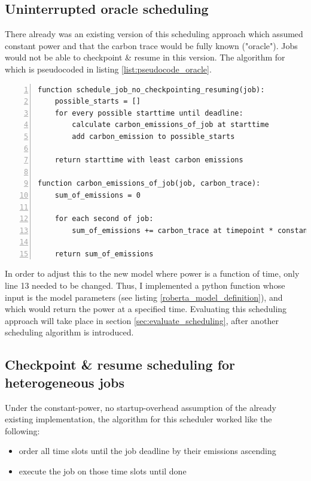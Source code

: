 \subsection{Uninterrupted oracle scheduling} \label{sec:uninterrupted_oracle_scheduling}

There already was an existing version of this scheduling approach which assumed constant power and that the carbon trace would be fully known ("oracle"). 
Jobs would not be able to checkpoint \& resume in this version.
The algorithm for which is pseudocoded in listing \ref{list:pseudocode_oracle}.

\begin{lstlisting}[frame=single, numbers=left, caption={Pseudocode for the original non-interrupt oracle scheduler}, label={list:pseudocode_oracle}, basicstyle=\ttfamily]
function schedule_job_no_checkpointing_resuming(job):
    possible_starts = []
    for every possible starttime until deadline:
        calculate carbon_emissions_of_job at starttime
        add carbon_emission to possible_starts
    
    return starttime with least carbon emissions

function carbon_emissions_of_job(job, carbon_trace):
    sum_of_emissions = 0

    for each second of job:
        sum_of_emissions += carbon_trace at timepoint * constant_watt
    
    return sum_of_emissions
\end{lstlisting}

In order to adjust this to the new model where power is a function of time, only line 13 needed to be changed. 
Thus, I implemented a python function whose input is the model parameters (see listing \ref{roberta_model_definition}), and which would return the power at a specified time. 
Evaluating this scheduling approach will take place in section \ref{sec:evaluate_scheduling}, after another scheduling algorithm is introduced.


\subsection{{Checkpoint \& resume scheduling for heterogeneous jobs}} \label{sec:checkpoint_resume_lp}

Under the constant-power, no startup-overhead assumption of the already existing implementation, the algorithm for this scheduler worked like the following:

\begin{itemize}
    \item order all time slots until the job deadline by their emissions ascending
    \item execute the job on those time slots until done
\end{itemize}

